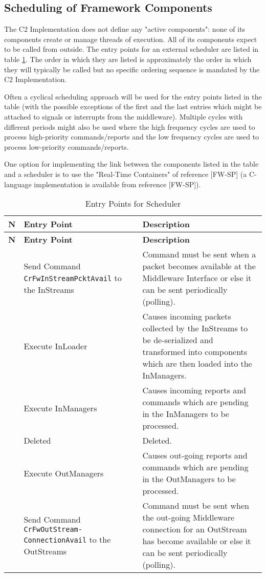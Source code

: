 \documentclass{pnp_article}
\begin{document}
\subsection{Scheduling of Framework Components}
The C2 Implementation does not define any "active components": none of its components create or manage threads of execution. All of its components expect to be called from outside. The entry points for an external scheduler are listed in table \ref{tab:EntryPoints}. The order in which they are listed is approximately the order in which they will typically be called but no specific ordering sequence is mandated by the C2 Implementation. 

Often a cyclical scheduling approach will be used for the entry points listed in the table (with the possible exceptions of the first and the last entries which might be attached to signals or interrupts from the middleware). Multiple cycles with different periods might also be used where the high frequency cycles are used to process high-priority commands/reports and the low frequency cycles are used to process low-priority commands/reports.

One option for implementing the link between the components listed in the table and a scheduler is to use the "Real-Time Containers" of reference [FW-SP] (a C-language implementation is available from reference [FW-SP]).

\begin{longtable}{|>{\centering\arraybackslash}m{0.3cm}|>{\raggedright}p{4.0cm}|p{8.5cm}|}
\caption{Entry Points for Scheduler} \label{tab:EntryPoints}\\
\hline
\rowcolor{light-gray}
\textbf{N} & \textbf{Entry Point} & \textbf{Description} \\
\hline\hline
\endfirsthead
\rowcolor{light-gray}
\textbf{N} & \textbf{Entry Point} & \textbf{Description} \\
\hline\hline
\endhead
1 & Send Command \texttt{CrFwInStreamPcktAvail} to the InStreams
& Command must be sent when a packet becomes available at the Middleware Interface or else it can be sent periodically (polling).
\\\hline
2 & Execute InLoader
& Causes incoming packets collected by the InStreams to be de-serialized and transformed into components which are then loaded into the InManagers. 
\\\hline
3 & Execute InManagers
& Causes incoming reports and commands which are pending in the InManagers to be processed. 
\\\hline
4 & Deleted & Deleted.
\\\hline
5 & Execute OutManagers
& Causes out-going reports and commands which are pending in the OutManagers to be processed.
\\\hline
6 & Send Command \texttt{CrFwOutStream-
ConnectionAvail} to the OutStreams
& Command must be sent when the out-going Middleware connection for an OutStream has become available or else it can be sent periodically (polling).
\\\hline
\end{longtable}
\end{document}
